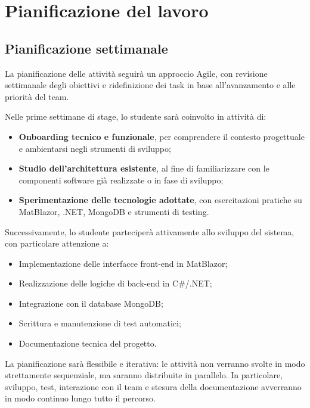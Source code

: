 
\section*{Pianificazione del lavoro}

\subsection*{Pianificazione settimanale}

La pianificazione delle attività seguirà un approccio Agile, con revisione settimanale degli obiettivi e ridefinizione dei task in base all’avanzamento e alle priorità del team.

Nelle prime settimane di stage, lo studente sarà coinvolto in attività di:
\begin{itemize}
    \item \textbf{Onboarding tecnico e funzionale}, per comprendere il contesto progettuale e ambientarsi negli strumenti di sviluppo;
    \item \textbf{Studio dell’architettura esistente}, al fine di familiarizzare con le componenti software già realizzate o in fase di sviluppo;
    \item \textbf{Sperimentazione delle tecnologie adottate}, con esercitazioni pratiche su MatBlazor, .NET, MongoDB e strumenti di testing.
\end{itemize}

Successivamente, lo studente parteciperà attivamente allo sviluppo del sistema, con particolare attenzione a:
\begin{itemize}
    \item Implementazione delle interfacce front-end in MatBlazor;
    \item Realizzazione delle logiche di back-end in C\#/.NET;
    \item Integrazione con il database MongoDB;
    \item Scrittura e manutenzione di test automatici;
    \item Documentazione tecnica del progetto.
\end{itemize}

La pianificazione sarà flessibile e iterativa: le attività non verranno svolte in modo strettamente sequenziale, ma saranno distribuite in parallelo. In particolare, sviluppo, test, interazione con il team e stesura della documentazione avverranno in modo continuo lungo tutto il percorso.


